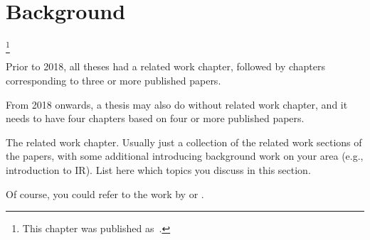 
\chapter{Background}
\label{chapter:background}

\footnote[]{This chapter was published as~\citep{...}.}
\acresetall

Prior to 2018, all theses had a related work chapter, followed by chapters corresponding to three or more published papers.

From 2018 onwards, a thesis may also do without related work chapter, and it needs to have four chapters based on four or more published papers.  

The related work chapter. Usually just a collection of the related work sections of the papers, with some additional introducing background work on your area (e.g., introduction to IR). List here which topics you discuss in this section.

Of course, you could refer to the work by \citet{meij2010thesis} or \citet{weerkamp2011thesis}.